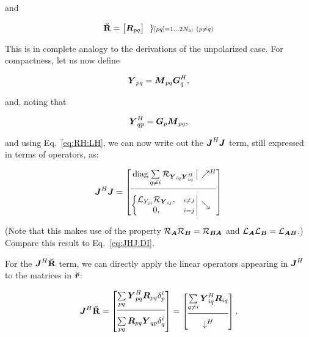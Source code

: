 \documentclass[useAMS,usenatbib]{mn2e}
\newcommand{\mat}[1]{{\bmath{#1}}}
\newcommand{\JJ}{\mat{J}} %
\newcommand{\MM}{\mat{M}}
\newcommand{\RR}{\mat{R}}
\newcommand{\GG}{\mat{G}}
\newcommand{\JHJ}{\JJ^H\JJ} %
\begin{document}
and 

\begin{equation}
\RRr = \Matrix{c}{ \mat{R}_{pq}}~~ 
\} \scriptstyle [pq]=1\dots 2\Nbl~(p\ne q)\\ 
\end{equation}

This is in complete analogy to the derivations of the unpolarized case. For compactness, let us now define

\newcommand{\YY}{\mat{Y}}
\newcommand{\ZZ}{\mat{Z}}
\[
\YY_{pq} = \MM_{pq} \GG^H_q,
\]

and, noting that 

\[
\YY_{qp}^H = \GG_p \MM_{pq},
\]

and using Eq.~\ref{eq:RH:LH}, we can now write out the $\JHJ$ term, still expressed in terms of 
operators, as:

\begin{equation}
\label{eq:JHJ:pol}
\JHJ = \JHJblocks{
  \mathrm{diag}\sum\limits_{q\ne i} \Rop{\YY_{iq} \YY^H_{iq}} 
}{
  \left \{ 
  \begin{array}{@{}cc@{}}
   \Lop{ Y_{ji}  } \Rop{\YY_{ij}},&{\scriptstyle i\ne j} \\
   0, &{\scriptstyle i=j}
  \end{array} \right . 
}
\end{equation}

(Note that this makes use of the property $\Rop{\mat{A}}\Rop{\mat{B}}=\Rop{\mat{BA}}$ and 
$\Lop{\mat{A}}\Lop{\mat{B}}=\Lop{\mat{AB}}$.) Compare this result to Eq.~\ref{eq:JHJ:DI}.

For the $\JJ^H\RRr$ term, we can directly apply the linear operators appearing in $\JJ^H$ 
to the matrices in $\Rr$:

\begin{equation}
\JJ^H\RRr = \Matrix{c}{ 
\sum\limits_{pq} \YY^H_{pq} \RR_{pq} \delta^{i}_p  \\
\hline\\[-8pt]
\sum\limits_{pq} \RR_{pq} \YY_{qp} \delta^{i}_q 
} = \Matrix{c}{
\sum\limits_{q\ne i} \YY^H_{iq} \RR_{iq} \\
\hline\\[-8pt]
\downarrow^H
},
\end{equation}
\end{document}
